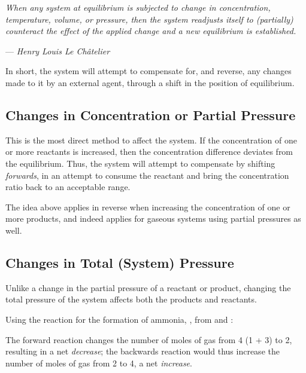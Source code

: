 			\textit{When any system at equilibrium is subjected to change in concentration, temperature, volume, or pressure, then the
			system readjusts itself to (partially) counteract the effect of the applied change and a new equilibrium is established.}

			--- \textit{Henry Louis Le Châtelier}

			In short, the system will attempt to compensate for, and reverse, any changes made to it by an external agent, through a shift
			in the position of equilibrium.



		\subsection{Changes in Concentration or Partial Pressure}

			This is the most direct method to affect the system. If the concentration of one or more reactants is increased, then the
			concentration difference deviates from the equilibrium. Thus, the system will attempt to compensate by shifting \textit{forwards},
			in an attempt to consume the reactant and bring the concentration ratio back to an acceptable range.

			The idea above applies in reverse when increasing the concentration of one or more products, and indeed applies for gaseous
			systems using partial pressures as well.




		\subsection{Changes in Total (System) Pressure}

			Unlike a change in the partial pressure of a reactant or product, changing the total pressure of the system affects both
			the products and reactants.

			Using the reaction for the formation of ammonia, , from  and :


			The forward reaction changes the number of moles of gas from \num{4} (\num{1} + \num{3}) to \num{2}, resulting in a net
			\textit{decrease}; the backwards reaction would thus increase the number of moles of gas from \num{2} to \num{4}, a net
			\textit{increase}.

